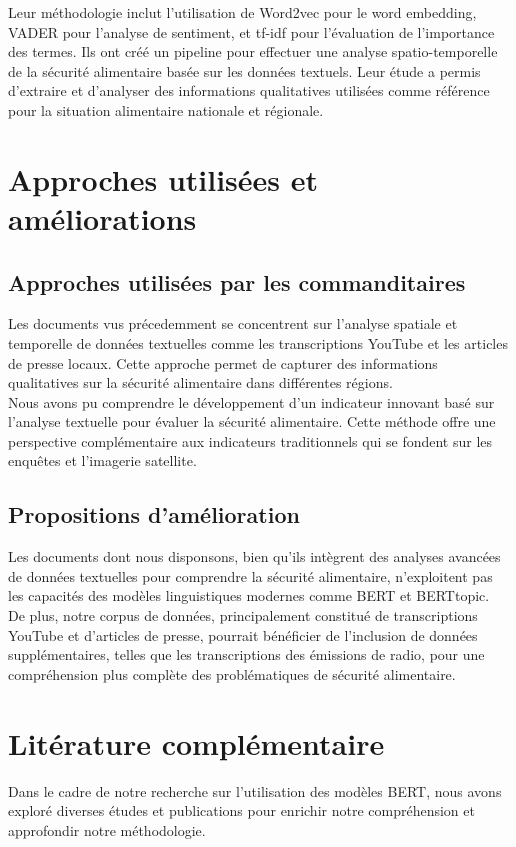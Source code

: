 \documentclass{article}
\begin{document}
Leur méthodologie inclut l'utilisation de Word2vec pour le word embedding, VADER pour l'analyse de sentiment, et tf-idf pour l'évaluation de l'importance des termes. Ils ont créé un pipeline pour effectuer une analyse spatio-temporelle de la sécurité alimentaire basée sur les données textuels. Leur étude a permis d'extraire et d'analyser des informations qualitatives utilisées comme référence pour la situation alimentaire nationale et régionale.

\section{Approches utilisées et améliorations}
\subsection{Approches utilisées par les commanditaires}
Les documents vus précedemment se concentrent sur l'analyse spatiale et temporelle de données textuelles comme les transcriptions YouTube et les articles de presse locaux. Cette approche permet de capturer des informations qualitatives sur la sécurité alimentaire dans différentes régions. \\

Nous avons pu comprendre le développement d'un indicateur innovant basé sur l'analyse textuelle pour évaluer la sécurité alimentaire. Cette méthode offre une perspective complémentaire aux indicateurs traditionnels qui se fondent sur les enquêtes et l'imagerie satellite.

\subsection{Propositions d'amélioration}
Les documents dont nous disponsons, bien qu'ils intègrent des analyses avancées de données textuelles pour comprendre la sécurité alimentaire, n'exploitent pas les capacités des modèles linguistiques modernes comme BERT et BERTtopic. \\

De plus, notre corpus de données, principalement constitué de transcriptions YouTube et d'articles de presse, pourrait bénéficier de l'inclusion de données supplémentaires, telles que les transcriptions des émissions de radio, pour une compréhension plus complète des problématiques de sécurité alimentaire.

\section{Litérature complémentaire}
Dans le cadre de notre recherche sur l'utilisation des modèles BERT, nous avons exploré diverses études et publications pour enrichir notre compréhension et approfondir notre méthodologie.
\end{document}
